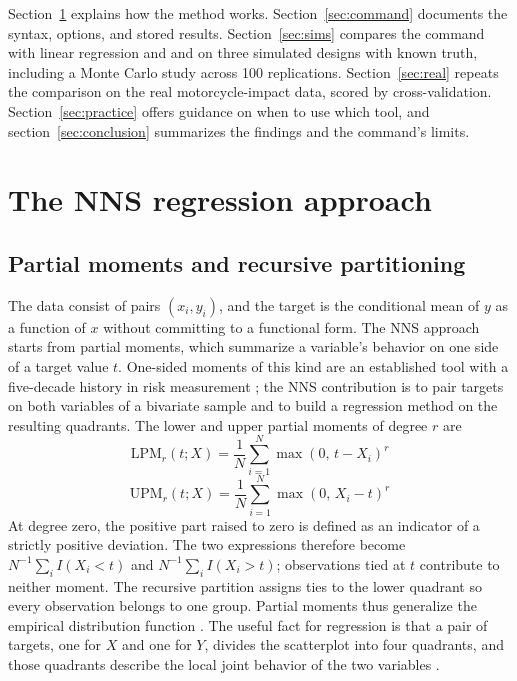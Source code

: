 \documentclass[bib]{statapress}
\begin{document}
Section~\ref{sec:method} explains how the method works.
Section~\ref{sec:command} documents the syntax, options, and stored results.
Section~\ref{sec:sims} compares the command with linear regression and
 and  on three simulated
designs with known truth, including a Monte Carlo study across 100
replications.  Section~\ref{sec:real} repeats the comparison on the real
motorcycle-impact data, scored by cross-validation.
Section~\ref{sec:practice} offers guidance on when to use which
tool, and section~\ref{sec:conclusion} summarizes the findings and the
command's limits.

\section{The NNS regression approach}
\label{sec:method}

\subsection{Partial moments and recursive partitioning}

The data consist of pairs $(x_i, y_i)$, and the target is the conditional mean
of $y$ as a function of $x$ without committing to a
functional form.  The NNS approach starts from partial moments, which
summarize a variable's behavior on one side of a target value $t$.  One-sided
moments of this kind are an established tool with a five-decade history in
risk measurement \citep{bawa_1975,fishburn_1977}; the NNS contribution is to
pair targets on both variables of a bivariate sample and to build a
regression method on the resulting quadrants.  The lower and upper partial moments of degree $r$ are
\[
  \mathrm{LPM}_r(t;X) = \frac{1}{N}\sum_{i=1}^{N} \max(0,\,t-X_i)^r
\]
\[
  \mathrm{UPM}_r(t;X) = \frac{1}{N}\sum_{i=1}^{N} \max(0,\,X_i-t)^r
\]
At degree zero, the positive part raised to zero is defined as an indicator
of a strictly positive deviation.  The two expressions therefore become
$N^{-1}\sum_i I(X_i<t)$ and $N^{-1}\sum_i I(X_i>t)$; observations tied at
$t$ contribute to neither moment.  The recursive partition assigns ties to
the lower quadrant so every observation belongs to one group.  Partial
moments thus generalize the empirical distribution function
\citep{viole_nawrocki_2012_cdf}.  The useful fact for regression is that a
pair of targets, one for $X$ and one for $Y$, divides the scatterplot into
four quadrants, and those quadrants describe the local joint behavior of the
two variables \citep{viole_nawrocki_2012_corr}.
\end{document}

